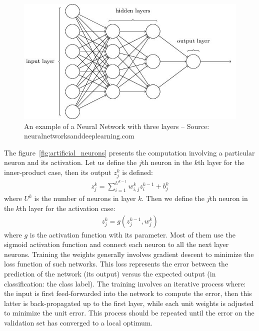 \documentclass[a4paper,12pt]{report}
\begin{document}
\begin{figure}[t]
    \begin{center}
        \includegraphics{thesis_figures/NN.jpg}
    \end{center}
    \caption{An example of a Neural Network with three layers -- Source: neuralnetworksanddeeplearning.com}
    \label{fig:neural_network}
\end{figure}

The figure~\ref{fig:artificial_neurons} presents the computation involving a particular neuron and its activation.
Let us define the $j$th neuron in the $k$th layer for the inner-product case, then its output $z^k_j$ is defined:
\begin{eqnarray}
    z^k_j = \sum_{i=1}^{U^{k-1}} w^k_{i,j} z^{k-1}_i + b^k_j
\end{eqnarray}
where $U^k$ is the number of neurons in layer $k$.
Then we define the $j$th neuron in the $k$th layer for the activation case:
\begin{eqnarray}
    z^k_j = g(z^{k-1}_j, w^k_{j})
\end{eqnarray}
where $g$ is the activation function with its parameter.
Most of them use the sigmoid activation function and connect each neuron to all the next layer neurons.
Training the weights generally involves gradient descent to minimize the loss function of such networks.
This loss represents the error between the prediction of the network (its output) versus the expected output (in classification: the class label).
The training involves an iterative process where: the input is first feed-forwarded into the network to compute the error, then this latter is back-propagated up to the first layer, while each unit weights is adjusted to minimize the unit error.
This process should be repeated until the error on the validation set has converged to a local optimum.
\end{document}
